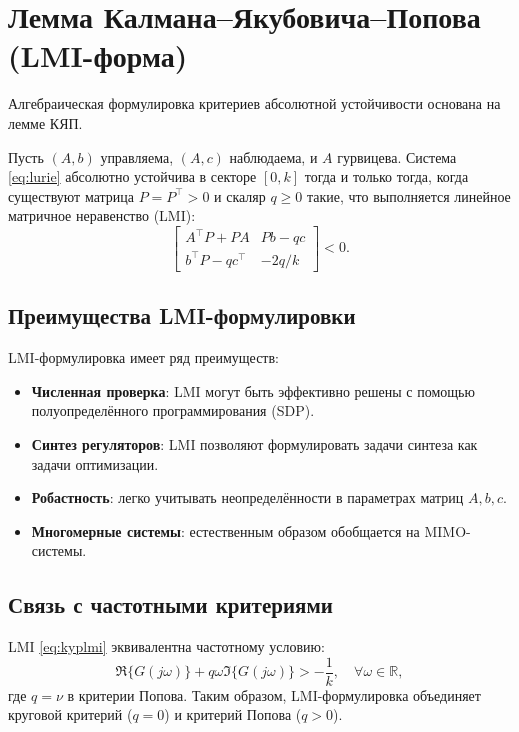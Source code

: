 \section{Лемма Калмана--Якубовича--Попова (LMI-форма)}

Алгебраическая формулировка критериев абсолютной устойчивости основана на лемме КЯП.

\begin{theorem}
Пусть $(A, b)$ управляема, $(A, c)$ наблюдаема, и $A$ гурвицева. Система \eqref{eq:lurie} абсолютно устойчива в секторе $[0, k]$ тогда и только тогда, когда существуют матрица $P=P^\top>0$ и скаляр $q\ge 0$ такие, что выполняется линейное матричное неравенство (LMI):
\begin{equation}
    \begin{bmatrix}
        A^\top P + P A & P b - q c\\
        b^\top P - q c^\top & -2q/k
    \end{bmatrix} < 0.
    \label{eq:kyplmi}
\end{equation}
\end{theorem}

\subsection{Преимущества LMI-формулировки}

LMI-формулировка имеет ряд преимуществ:
\begin{itemize}
    \item \textbf{Численная проверка}: LMI могут быть эффективно решены с помощью полуопределённого программирования (SDP).
    \item \textbf{Синтез регуляторов}: LMI позволяют формулировать задачи синтеза как задачи оптимизации.
    \item \textbf{Робастность}: легко учитывать неопределённости в параметрах матриц $A, b, c$.
    \item \textbf{Многомерные системы}: естественным образом обобщается на MIMO-системы.
\end{itemize}

\subsection{Связь с частотными критериями}

LMI \eqref{eq:kyplmi} эквивалентна частотному условию:
\begin{equation}
    \Re\{G(j\omega)\} + q\omega\Im\{G(j\omega)\} > -\frac{1}{k}, \quad \forall \omega\in\mathbb{R},
\end{equation}
где $q = \nu$ в критерии Попова. Таким образом, LMI-формулировка объединяет круговой критерий ($q=0$) и критерий Попова ($q>0$).

